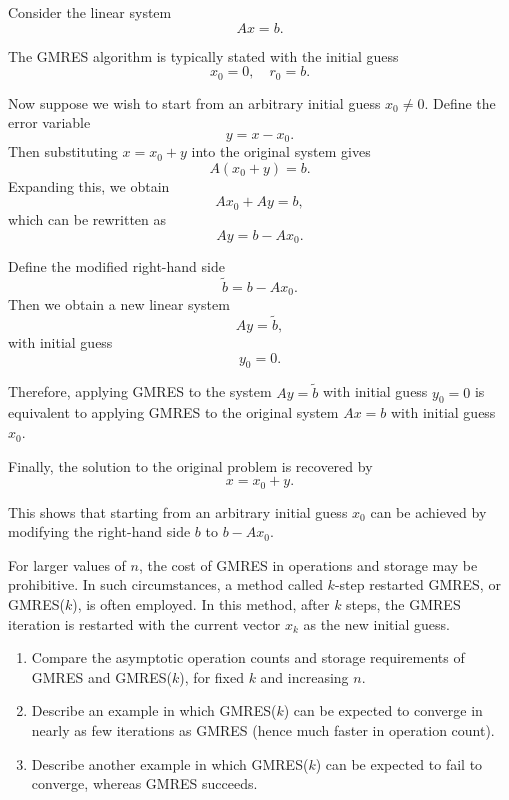 \documentclass{ctexart}
\begin{document}
  \begin{solution}
    Consider the linear system
    \[
      Ax = b.
    \]

    The GMRES algorithm is typically stated with the initial guess
    \[
      x_0 = 0, \quad r_0 = b.
    \]

    Now suppose we wish to start from an arbitrary initial guess $x_0 \neq 0$.
    Define the error variable
    \[
      y = x - x_0.
    \]
    Then substituting $x = x_0 + y$ into the original system gives
    \[
      A(x_0 + y) = b.
    \]
    Expanding this, we obtain
    \[
      Ax_0 + Ay = b,
    \]
    which can be rewritten as
    \[
      Ay = b - Ax_0.
    \]

    Define the modified right-hand side
    \[
      \tilde{b} = b - Ax_0.
    \]
    Then we obtain a new linear system
    \[
      Ay = \tilde{b},
    \]
    with initial guess
    \[
      y_0 = 0.
    \]

    Therefore, applying GMRES to the system $Ay = \tilde{b}$ with initial guess
    $y_0 = 0$ is equivalent to applying GMRES to the original system $Ax = b$
    with initial guess $x_0$.

    Finally, the solution to the original problem is recovered by
    \[
      x = x_0 + y.
    \]

    This shows that starting from an arbitrary initial guess $x_0$ can be achieved
    by modifying the right-hand side $b$ to $b - Ax_0$.
  \end{solution}
  \begin{problem}\label{pro:8}
    For larger values of $n$, the cost of GMRES in operations and storage may be prohibitive.
    In such circumstances, a method called $k$-step restarted GMRES, or GMRES($k$), is often employed.
    In this method, after $k$ steps, the GMRES iteration is restarted with the current vector $x_k$
    as the new initial guess.

    \begin{enumerate}[label=(\alph*)]
      \item Compare the asymptotic operation counts and storage requirements of GMRES and GMRES($k$),
        for fixed $k$ and increasing $n$.

      \item Describe an example in which GMRES($k$) can be expected to converge in nearly as few iterations
        as GMRES (hence much faster in operation count).

      \item Describe another example in which GMRES($k$) can be expected to fail to converge,
        whereas GMRES succeeds.
    \end{enumerate}
  \end{problem}
\end{document}
